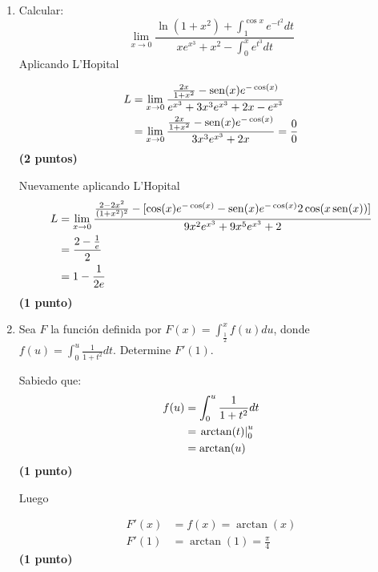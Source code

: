 \documentclass[letterpaper,10pt]{article}
\newcommand{\dis}{\displaystyle}
\def\sin{\operatorname{sen}}
\begin{document}
\begin{enumerate}
\newpage







\item Calcular: \\
\[ \lim_{x \to 0} \frac{\ln(1+x^2)+\dis \int_1^{\cos x} e^{-t^2}dt}{xe^{x^3}+x^2-\dis \int_0^{x}e^{t^3}dt}\]
\vspace{2mm}
Aplicando L'Hopital

\begin{align*}
 \dis  L  &= \lim_{x \to 0} \frac{\frac{2x}{1+x^2}-\sin(x)e^{-\cos(x)}}{e^{x^3}+3x^3e^{x^3} +2x-e^{x^3}}\\
  \dis    &= \lim_{x \to 0} \frac{\frac{2x}{1+x^2}-\sin(x)e^{-\cos(x)}}{3x^3e^{x^3} +2x} = \frac{0}{0}
\end{align*}
\dotfill \textbf{(2 puntos)}

Nuevamente aplicando L'Hopital
\begin{align*}
 \dis  L  &= \lim_{x \to 0} \frac{\frac{2-2x^2}{(1+x^2)^2}-[\cos(x)e^{-\cos(x)}-\sin(x)e^{-\cos(x)}2\cos(x\sin(x))]}{9x^2e^{x^3} + 9x^5e^{x^3} +2}\\
  \dis    &= \frac{2-\frac{1}{e}}{2}\\
  \dis    &= 1- \frac{1}{2e}\\
\end{align*}
\dotfill \textbf{(1 punto)}







\newpage
\item Sea $F$ la función definida por $\dis F(x)= \int_{\frac{1}{2}}^{x}f(u)du$, donde $\dis f(u)= \int_0^u \frac{1}{1+t^2}dt$. Determine $F'(1)$.\\
\vspace{2mm}

Sabiedo que:
\begin{align*}
 \dis  f(u)&= \int_0^u \frac{1}{1+t^2}dt\\
  \dis   &= \left.\arctan(t)\right|_0^u\\
  \dis   &= \arctan(u)
\end{align*}
\dotfill \textbf{(1 punto)}

Luego

\begin{align*}
 \dis  F'(x)&= f(x) = \arctan(x)\\
  \dis F'(1)  &= \arctan(1) = \frac{\pi}{4}
\end{align*}
\dotfill \textbf{(1 punto)}


\end{enumerate}
\end{document}
